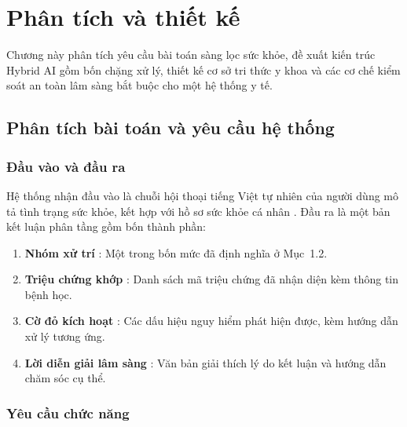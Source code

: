 \chapter{Phân tích và thiết kế}
\label{ch:thietke}

\begin{muctieu}
Chương này phân tích yêu cầu bài toán sàng lọc sức khỏe, đề xuất kiến trúc
Hybrid AI gồm bốn chặng xử lý, thiết kế cơ sở tri thức y khoa và các cơ chế
kiểm soát an toàn lâm sàng bắt buộc cho một hệ thống y tế.
\end{muctieu}

\section{Phân tích bài toán và yêu cầu hệ thống}

\subsection{Đầu vào và đầu ra}

Hệ thống nhận đầu vào là chuỗi hội thoại tiếng Việt tự nhiên của người dùng
mô tả tình trạng sức khỏe, kết hợp với hồ sơ sức khỏe cá nhân
. Đầu ra là một bản kết luận
phân tầng gồm bốn thành phần:
\begin{enumerate}[leftmargin=1.6em, itemsep=2pt]
  \item \textbf{Nhóm xử trí }: Một trong bốn mức đã định nghĩa ở
        Mục~1.2.
  \item \textbf{Triệu chứng khớp }: Danh sách mã triệu
        chứng đã nhận diện kèm thông tin bệnh học.
  \item \textbf{Cờ đỏ kích hoạt }: Các dấu hiệu nguy
        hiểm phát hiện được, kèm hướng dẫn xử lý tương ứng.
  \item \textbf{Lời diễn giải lâm sàng }: Văn bản giải thích
        lý do kết luận và hướng dẫn chăm sóc cụ thể.
\end{enumerate}

\subsection{Yêu cầu chức năng}

